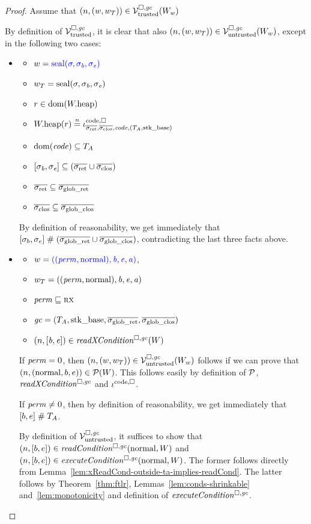 \documentclass[a4paper]{article}
\begin{document}
\begin{proof}
  Assume that $\left(n,(w,w_T)\right) \in \mathcal{V}^{\square,\mathit{gc}}_{\mathrm{trusted}}(W_w)$

  By definition of $\mathcal{V}^{\square,\mathit{gc}}_{\mathrm{trusted}}$, it is clear that also $\left(n,(w,w_T)\right) \in \mathcal{V}^{\square,\mathit{gc}}_{\mathrm{untrusted}}(W_w)$, except in the following two cases:
  \begin{itemize}
  \item
    \begin{itemize}
    \item $w = {\color{blue} \mathrm{seal}(\sigma,\sigma_{\mathit{b}},\sigma_{\mathit{e}})}$
    \item $w_T = \mathrm{seal}(\sigma,\sigma_{\mathit{b}},\sigma_{\mathit{e}})$ 
    \item $r \in \mathrm{dom}(W.\mathrm{heap})$
    \item $\pwheap(r) \nequal \codereg{\sigrets,\sigcloss,\code,(\ta,\stkb)}$
    \item $\mathrm{dom}(\mathit{code}) \subseteq T_{A}$ 
    \item $[\sigma_\baddr,\sigma_\eaddr] \subseteq (\sigrets\cup\sigcloss)$ 
    \item $\sigrets \subseteq \gsigrets$
    \item $\sigcloss \subseteq \gsigcloss$
    \end{itemize}

    By definition of reasonability, we get immediately that $[\sigma_b,\sigma_e]\mathrel{\#} (\overline{\sigma_{\mathrm{glob\_ret}}}\cup \overline{\sigma_{\mathrm{glob\_clos}}})$, contradicting the last three facts above.
  \item 
    \begin{itemize}
    \item $w = {\color{blue} ((\mathit{perm},\mathrm{normal}),\mathit{b},\mathit{e},\mathit{a})}$, 
    \item $w_T =
      ((\mathit{perm},\mathrm{normal}),\mathit{b},\mathit{e},\mathit{a})$
    \item $\mathit{perm} \sqsubseteq \textsc{rx}$
    \item $\mathit{gc} = (T_{A},\mathrm{stk\_base},\overline{\sigma_{\mathrm{glob\_ret}}},\overline{\sigma_{\mathrm{glob\_clos}}})$
    \item $\npair{[\baddr,\eaddr]} \in \xReadCond[\square,\gc]{W}$
    \end{itemize}

    If $\mathit{perm} = \textsc{0}$, then $\left(n,(w,w_T)\right) \in \mathcal{V}^{\square,\mathit{gc}}_{\mathrm{untrusted}}(W_w)$ follows if we can prove that $\left(n,(\mathrm{normal},b,e)\right) \in \mathcal{P}(W)$.
    This follows easily by definition of $\mathcal{P}$, $\xReadCond{}$ and $\iota^{\mathrm{code},\square}_{}$.
    
    If $\mathit{perm} \neq \textsc{0}$, then by definition of reasonability, we get immediately that $[b,e] \mathrel{\#} T_{A}$.

    By definition of $\mathcal{V}^{\square,\mathit{gc}}_{\mathrm{untrusted}}$, it suffices to show that $\npair{[b,e]} \in \readCond{\normal,W}$ and $\npair{[b,e]} \in \execCond{\normal,W}$.
    The former follows directly from Lemma~\ref{lem:xReadCond-outside-ta-implies-readCond}.
    The latter follows by Theorem~\ref{thm:ftlr}, Lemmas~\ref{lem:conds-shrinkable} and~\ref{lem:monotonicity} and definition of $\execCond{}$.
  \end{itemize}
\end{proof}
\end{document}
